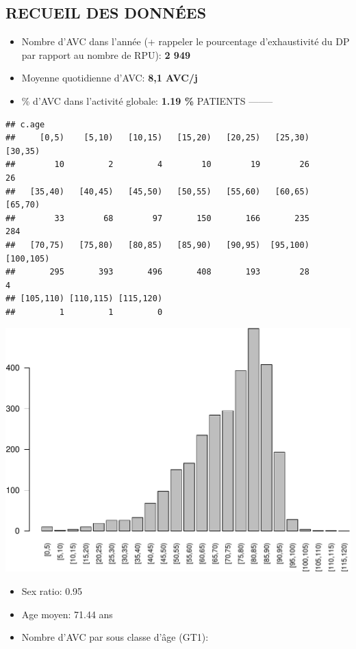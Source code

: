 \documentclass[]{article}
\begin{document}
\subsection{RECUEIL DES DONNÉES}\label{recueil-des-donnees-3}

\begin{itemize}
\itemsep1pt\parskip0pt
\item
  Nombre d'AVC dans l'année (+ rappeler le pourcentage d'exhaustivité du
  DP par rapport au nombre de RPU): \textbf{2 949}
\item
  Moyenne quotidienne d'AVC: \textbf{8,1 AVC/j}
\item
  \% d'AVC dans l'activité globale: \textbf{1.19 \%} PATIENTS --------
\end{itemize}

\begin{verbatim}
## c.age
##     [0,5)    [5,10)   [10,15)   [15,20)   [20,25)   [25,30)   [30,35) 
##        10         2         4        10        19        26        26 
##   [35,40)   [40,45)   [45,50)   [50,55)   [55,60)   [60,65)   [65,70) 
##        33        68        97       150       166       235       284 
##   [70,75)   [75,80)   [80,85)   [85,90)   [90,95)  [95,100) [100,105) 
##       295       393       496       408       193        28         4 
## [105,110) [110,115) [115,120) 
##         1         1         0
\end{verbatim}

\includegraphics{rapport2014_V4_files/figure-latex/patients-1.pdf}

\begin{itemize}
\itemsep1pt\parskip0pt
\item
  Sex ratio: 0.95
\item
  Age moyen: 71.44 ans
\item
  Nombre d'AVC par sous classe d'âge (GT1):
\end{itemize}
\end{document}
